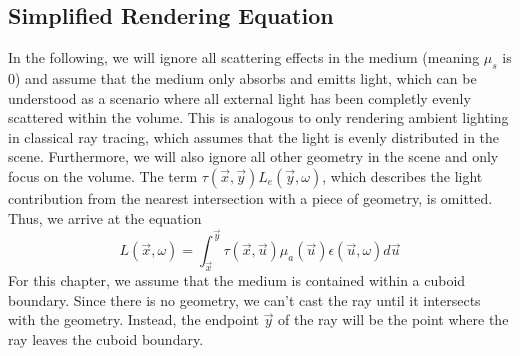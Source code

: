 \subsection{Simplified Rendering Equation}
In the following, we will ignore all scattering effects in the medium (meaning $\mu_s $ is 0) and assume that the medium only absorbs and emitts light\cite{10.1145/147130.147155}, which can be understood as a scenario where all external light has been completly evenly scattered within the volume. This is analogous to only rendering ambient lighting in classical ray tracing, which assumes that the light is evenly distributed in the scene.
Furthermore, we will also ignore all other geometry in the scene and only focus on the volume. The term $\tau(\vec{x}, \vec{y}) L_e(\vec{y}, \omega )$, which describes the light contribution from the nearest intersection with a piece of geometry, is omitted.
Thus, we arrive at the equation
\begin{equation} \label{eq:simplified_req}
L(\vec{x}, \omega ) = \int_{\vec{x}}^{\vec{y}} \tau(\vec{x}, \vec{u}){\mu}_a(\vec{u})\epsilon (\vec{u}, \omega)d\vec{u}
\end{equation}
For this chapter, we assume that the medium is contained within a cuboid boundary\cite{10.1145/147130.147155, 10.1145/78964.78965}. Since there is no geometry, we can't cast the ray until it intersects with the geometry. Instead, the endpoint $\vec{y}$ of the ray will be the point where the ray leaves the cuboid boundary.

